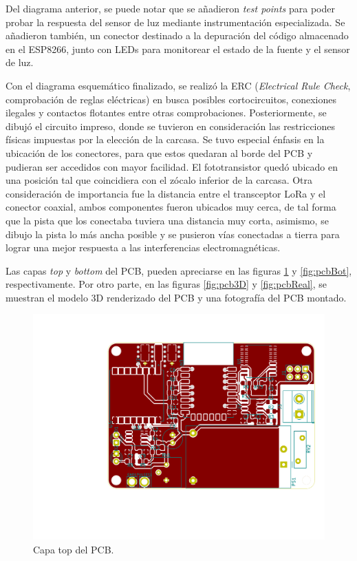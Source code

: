 Del diagrama anterior, se puede notar que se añadieron \textit{test points} para poder probar la respuesta del sensor de luz mediante instrumentación especializada. Se añadieron también, un conector destinado a la depuración del código almacenado en el ESP8266, junto con LEDs para monitorear el estado de la fuente y el sensor de luz.

Con el diagrama esquemático finalizado, se realizó la ERC (\textit{Electrical Rule Check}, comprobación de reglas eléctricas) en busca posibles cortocircuitos, conexiones ilegales y contactos flotantes entre otras comprobaciones. Posteriormente, se dibujó el circuito impreso, donde se tuvieron en consideración las restricciones físicas impuestas por la elección de la carcasa. Se tuvo especial énfasis en la ubicación de los conectores, para que estos quedaran al borde del PCB y pudieran ser accedidos con mayor facilidad. El fototransistor quedó ubicado en una posición tal que coincidiera con el zócalo inferior de la carcasa. Otra consideración de importancia fue la distancia entre el transceptor LoRa y el conector coaxial, ambos componentes fueron ubicados muy cerca, de tal forma que la pista que los conectaba tuviera una distancia muy corta, asimismo, se dibujo la pista lo más ancha posible y se pusieron vías conectadas a tierra para lograr una mejor respuesta a las interferencias electromagnéticas.

Las capas \textit{top} y \textit{bottom} del PCB, pueden apreciarse en las figuras \ref{fig:pcbTop} y \ref{fig:pcbBot}, respectivamente. Por otro parte, en las figuras \ref{fig:pcb3D} y \ref{fig:pcbReal}, se muestran el modelo 3D renderizado del PCB y una fotografía del PCB montado.

\begin{figure}[h]
	\centering
	\includegraphics[scale=0.5]{./Figures/pcb_top.pdf}
	\caption{Capa top del PCB.}
		\label{fig:pcbTop}
\end{figure}

